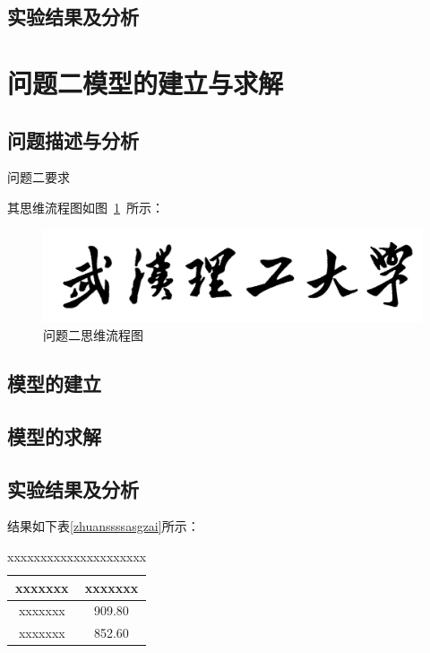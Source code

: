 \documentclass{whutmod}
\begin{document}
		
		
		
        \subsection{实验结果及分析}
  
	\section{问题二模型的建立与求解}
		\subsection{问题描述与分析}
			问题二要求

    		其思维流程图如图~\ref{lssssct}~所示：

			\begin{figure}[H]
				\centering
				\includegraphics[width=\textwidth]{figures/whut.jpg}
				\caption{问题二思维流程图}\label{lssssct}
			\end{figure}

		\subsection{模型的建立}
		
		\subsection{模型的求解}

        \subsection{实验结果及分析}
        
			结果如下表\ref{zhuanssssasgzai}所示：
			\begin{table}[H]
			\centering		
			\caption{xxxxxxxxxxxxxxxxxxxxx}\label{biao1}
			\begin{tabular}{cc}
			\toprule[2pt]
				\multicolumn{1}{m{5cm}}{\centering xxxxxxx}
				& \multicolumn{1}{m{5cm}}{\centering xxxxxxx}
				\\
				\midrule[1pt]
				xxxxxxx &   909.80\\ 
				xxxxxxx & 	852.60\\ 
			\bottomrule[2pt]	
			\end{tabular}
			\end{table}
  
\end{document}

